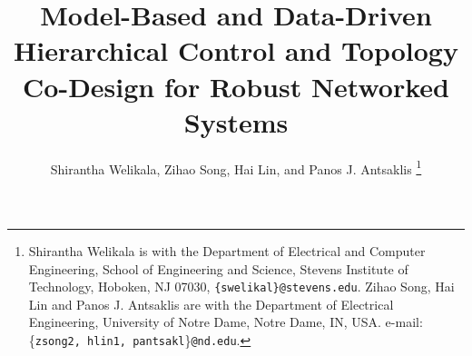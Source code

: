 \documentclass[letterpaper, 10 pt, conference]{ieeeconf}%
\newcommand{\0}{\mathbf{0}}
\begin{document}
\title{
{\LARGE \textbf{
{Model-Based and Data-Driven Hierarchical Control and Topology Co-Design for Robust Networked Systems}
}}}



\author{Shirantha Welikala, Zihao Song, Hai Lin, and Panos J. Antsaklis
\thanks{Shirantha Welikala is with the Department of Electrical and Computer Engineering, School of Engineering and Science, Stevens Institute of Technology, Hoboken, NJ 07030, \texttt{{\small \{swelikal\}@stevens.edu}}. Zihao Song, Hai Lin and Panos J. Antsaklis are with the Department of Electrical Engineering, University of Notre Dame, Notre Dame, IN, USA. e-mail: \{{\tt zsong2, hlin1, pantsakl}\}{\tt @nd.edu}.}}

\maketitle

\end{document}
